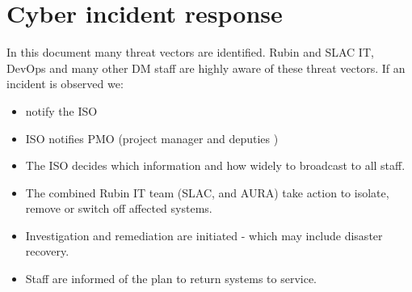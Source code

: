 \section{Cyber incident response}
In this document many threat vectors are identified.
Rubin and SLAC  IT, DevOps and many other DM staff are highly aware of these threat vectors.
If an incident is observed we:
\begin{itemize}
\item notify the \gls{ISO} 
\item \gls{ISO} notifies \gls{PMO} (project manager and deputies )
\item The \gls{ISO} decides which information and  how widely to broadcast to all staff.
\item The combined Rubin IT team (SLAC, and AURA)  take action to isolate, remove or  switch off affected systems.
\item Investigation and remediation are initiated - which may include disaster recovery.
\item Staff are informed of the plan to return systems to service.
\end{itemize}


